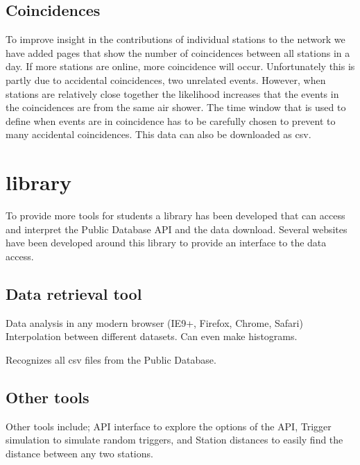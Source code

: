 \subsection{Coincidences}

To improve insight in the contributions of individual stations to the
\hisparc network we have added pages that show the number of
coincidences between all \hisparc stations in a day. If more stations
are online, more coincidence will occur. Unfortunately this is partly
due to accidental coincidences, two unrelated events. However, when
stations are relatively close together the likelihood increases that the
events in the coincidences are from the same air shower. The time window
that is used to define when events are in coincidence has to be
carefully chosen to prevent to many accidental coincidences. This data
can also be downloaded as csv.


\section{\jsparc \javascript library}

To provide more tools for students a \javascript library has been
developed that can access and interpret the Public Database API and the
data download. Several websites have been developed around this library
to provide an interface to the data access.


\subsection{Data retrieval tool}

Data analysis in any modern browser (IE9+, Firefox, Chrome, Safari)
Interpolation between different datasets. Can even make histograms.

Recognizes all csv files from the Public Database.


\subsection{Other tools}

Other tools include; API interface to explore the options of the API,
Trigger simulation to simulate random triggers, and Station distances to
easily find the distance between any two stations.
